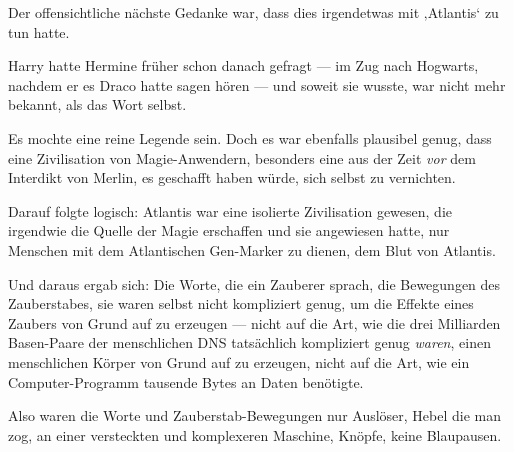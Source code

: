 Der offensichtliche nächste Gedanke war, dass dies irgendetwas mit ‚Atlantis‘ zu tun hatte.

Harry hatte Hermine früher schon danach gefragt — im Zug nach Hogwarts, nachdem er es Draco hatte sagen hören — und soweit sie wusste, war nicht mehr bekannt, als das Wort selbst.

Es mochte eine reine Legende sein. Doch es war ebenfalls plausibel genug, dass eine Zivilisation von Magie-Anwendern, besonders eine aus der Zeit \emph{vor} dem Interdikt von Merlin, es geschafft haben würde, sich selbst zu vernichten.

Darauf folgte logisch: Atlantis war eine isolierte Zivilisation gewesen, die irgendwie die Quelle der Magie erschaffen und sie angewiesen hatte, nur Menschen mit dem Atlantischen Gen-Marker zu dienen, dem Blut von Atlantis.

Und daraus ergab sich: Die Worte, die ein Zauberer sprach, die Bewegungen des Zauberstabes, sie waren selbst nicht kompliziert genug, um die Effekte eines Zaubers von Grund auf zu erzeugen — nicht auf die Art, wie die drei Milliarden Basen-Paare der menschlichen DNS tatsächlich kompliziert genug \emph{waren}, einen menschlichen Körper von Grund auf zu erzeugen, nicht auf die Art, wie ein Computer-Programm tausende Bytes an Daten benötigte.

Also waren die Worte und Zauberstab-Bewegungen nur Auslöser, Hebel die man zog, an einer versteckten und komplexeren Maschine, Knöpfe, keine Blaupausen.

